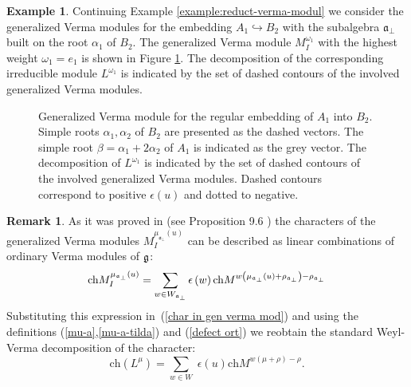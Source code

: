 \documentclass[12pt]{article}
\theoremstyle{definition}
\newtheorem{remark}{Remark}
\newtheorem{example}{Example}
\newcommand{\afb}{\mathfrak{a}_{\bot}}
\begin{document}
\begin{example}
  Continuing Example \ref{example:reduct-verma-modul} we consider the generalized Verma modules for the
  embedding  $A_{1}\hookrightarrow B_{2}$ with the subalgebra $\afb$ built on the root $\alpha_{1}$
  of $B_{2}$. The generalized Verma module $M^{\omega_{1}}_{I}$ with the highest weight
  $\omega_{1}=e_{1}$ is shown in Figure \ref{fig:B2_Verma_Decomp}. The decomposition of the corresponding irreducible module
  $L^{\omega_{1}}$ is indicated by the set of dashed contours of the involved generalized Verma
  modules. 
   \begin{figure}[h!bt]
  \noindent{}
  \caption{Generalized Verma module  for the regular embedding of $A_1$ into $B_2$. Simple roots $\alpha_1, \alpha_2$ of $B_2$ are presented as the dashed vectors.
    The simple root $\beta = \alpha_1+2\alpha_2$ of $A_1$ is indicated as the grey vector. The
    decomposition of $L^{\omega_{1}}$ is indicated by the set of dashed contours of the involved generalized Verma
  modules. Dashed contours correspond to positive $\epsilon(u)$ and dotted to negative.}

 \label{fig:B2_Verma_Decomp}
\end{figure}

\end{example}

\begin{remark}
As it was proved in \cite{humphreys2008representations} (see Proposition 9.6 ) the characters of the
generalized Verma modules $M_{I}^{\mu _{\afb}\left( u\right) }$
can be described as linear combinations of ordinary Verma modules of $\frak{g%
}$:
\begin{equation*}
\mathrm{ch}M_{I}^{\mu _{\afb}\left( u\right) }=\sum_{w\in W_{%
\afb}}\epsilon \left( w\right) \mathrm{ch}M^{w\left( \mu _{%
\afb}\left( u\right) +\rho _{\afb}\right) -\rho _{%
\afb}}
\end{equation*}
Substituting this expression in\ (\ref{char in gen verma mod}) and using the
definitions (\ref{mu-a},\ref{mu-a-tilda}) and (\ref{defect ort}) we reobtain
the standard Weyl-Verma decomposition of the character:
\begin{equation*}
\mathrm{ch}\left( L^{\mu }\right) =\sum_{w\in W}\;\epsilon (u)\mathrm{ch}%
M^{w\left( \mu +\rho \right) -\rho }.
\end{equation*}
\end{remark}
\end{document}
